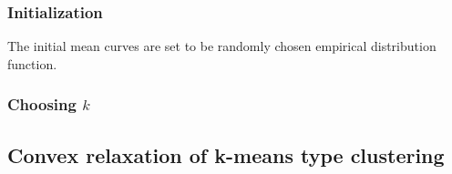 		\subsubsection*{Initialization}
			The initial mean curves are set to be randomly chosen empirical distribution function.

		\subsubsection*{Choosing $k$}
			



		


		
			


	\subsection{Convex relaxation of k-means type clustering}
